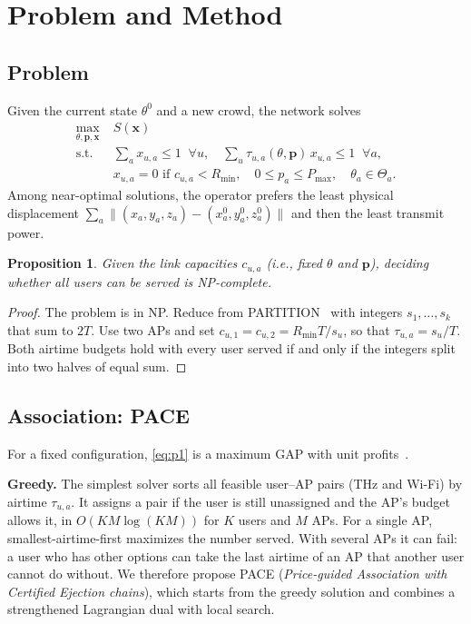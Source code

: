 \documentclass[conference]{IEEEtran}
\newtheorem{proposition}{Proposition}
\newcommand{\Rmin}{R_{\min}}
\newcommand{\Pmax}{P_{\max}}
\begin{document}
\section{Problem and Method}\label{sec:method}
\subsection{Problem}
Given the current state $\theta^0$ and a new crowd, the network solves
\begin{align}
\max_{\theta,\mathbf{p},\mathbf{x}}\;& S(\mathbf{x}) \label{eq:p1}\\
\text{s.t.}\;& \textstyle\sum_{a}x_{u,a}\le1\;\;\forall u,\quad \sum_{u}\tau_{u,a}(\theta,\mathbf{p})\,x_{u,a}\le1\;\;\forall a,\nonumber\\
& x_{u,a}=0 \text{ if } c_{u,a}<\Rmin,\quad 0\le p_a\le\Pmax,\quad \theta_a\in\Theta_a.\nonumber
\end{align}
Among near-optimal solutions, the operator prefers the least physical displacement $\sum_a\lVert(x_a,y_a,z_a)-(x^0_a,y^0_a,z^0_a)\rVert$ and then the least transmit power.

\begin{proposition}\label{prop:np}
Given the link capacities $c_{u,a}$ (i.e., fixed $\theta$ and $\mathbf{p}$), deciding whether all users can be served is NP-complete.
\end{proposition}
\begin{proof}
The problem is in NP.
Reduce from PARTITION~\cite{garey1979computers} with integers $s_1,\dots,s_k$ that sum to $2T$.
Use two APs and set $c_{u,1}=c_{u,2}=\Rmin T/s_u$, so that $\tau_{u,a}=s_u/T$.
Both airtime budgets hold with every user served if and only if the integers split into two halves of equal sum.
\end{proof}

\subsection{Association: PACE}\label{sec:pace}
For a fixed configuration, \eqref{eq:p1} is a maximum GAP with unit profits~\cite{fleischer2006gap}.

\textbf{Greedy.}
The simplest solver sorts all feasible user--AP pairs (THz and Wi-Fi) by airtime $\tau_{u,a}$.
It assigns a pair if the user is still unassigned and the AP's budget allows it, in $O(KM\log(KM))$ for $K$ users and $M$ APs.
For a single AP, smallest-airtime-first maximizes the number served.
With several APs it can fail: a user who has other options can take the last airtime of an AP that another user cannot do without.
We therefore propose PACE (\emph{Price-guided Association with Certified Ejection chains}), which starts from the greedy solution and combines a strengthened Lagrangian dual with local search.
\end{document}
